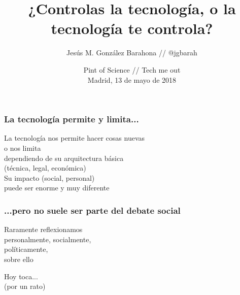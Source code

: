 \documentclass[17pt,aspectratio=169,hyperref=pdfusetitle]{beamer}
\title[¿Controlas la tecnología...?]{¿Controlas la tecnología, o la tecnología te controla?}
\author[Jesús M. González Barahona]{Jesús M. González Barahona //
@jgbarah}
\institute[URJC]{Universidad Rey Juan Carlos \\
}
\date[Pint of Science 2018]{Pint of Science // Tech me out \\
  Madrid, 13 de mayo de 2018}
\begin{document}
\begin{frame}
  \maketitle
\end{frame}


\begin{frame}
\frametitle{La tecnología permite y limita...}

\begin{flushright}
La tecnología nos permite hacer cosas nuevas \\
o nos limita \\
dependiendo de su arquitectura básica \\
(técnica, legal, económica) \\
\vspace{.2cm}
Su impacto (social, personal) \\
puede ser enorme y muy diferente \\
\end{flushright}

\end{frame}


\begin{frame}
\frametitle{...pero no suele ser parte del debate social}

\begin{center}
{\Large
Raramente reflexionamos\\
personalmente, socialmente, \\
políticamente, \\
sobre ello \\
}
\end{center}

\end{frame}


\begin{frame}

\begin{center}
{\Huge
Hoy toca... \\
(por un rato) \\
}
\end{center}

\end{frame}
\end{document}
